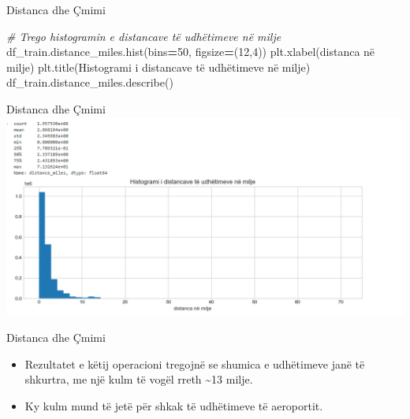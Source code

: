 \documentclass[
  ignorenonframetext,
]{beamer}
\newenvironment{Shaded}{\begin{snugshade}}{\end{snugshade}}
\newcommand{\CommentTok}[1]{\textcolor[rgb]{0.56,0.35,0.01}{\textit{#1}}}
\newcommand{\DecValTok}[1]{\textcolor[rgb]{0.00,0.00,0.81}{#1}}
\newcommand{\NormalTok}[1]{#1}
\newcommand{\OperatorTok}[1]{\textcolor[rgb]{0.81,0.36,0.00}{\textbf{#1}}}
\newcommand{\StringTok}[1]{\textcolor[rgb]{0.31,0.60,0.02}{#1}}
\begin{document}
\begin{frame}[fragile]{Distanca dhe Çmimi}
\protect\hypertarget{distanca-dhe-uxe7mimi-2}{}

\begin{Shaded}
\begin{Highlighting}[]
\CommentTok{\# Trego histogramin e distancave të udhëtimeve në milje}
\NormalTok{df\_train.distance\_miles.hist(bins}\OperatorTok{=}\DecValTok{50}\NormalTok{, figsize}\OperatorTok{=}\NormalTok{(}\DecValTok{12}\NormalTok{,}\DecValTok{4}\NormalTok{))}
\NormalTok{plt.xlabel(}\StringTok{\textquotesingle{}distanca në milje\textquotesingle{}}\NormalTok{)}
\NormalTok{plt.title(}\StringTok{\textquotesingle{}Histogrami i distancave të udhëtimeve në milje\textquotesingle{}}\NormalTok{)}
\NormalTok{df\_train.distance\_miles.describe()}
\end{Highlighting}
\end{Shaded}
\end{frame}

\begin{frame}{Distanca dhe Çmimi}
\protect\hypertarget{distanca-dhe-uxe7mimi-3}{}
\includegraphics{./Figs/train21.png}
\end{frame}

\begin{frame}{Distanca dhe Çmimi}
\protect\hypertarget{distanca-dhe-uxe7mimi-4}{}
\begin{itemize}
\item
  Rezultatet e këtij operacioni tregojnë se shumica e udhëtimeve janë të
  shkurtra, me një kulm të vogël rreth \textasciitilde13 milje.
\item
  Ky kulm mund të jetë për shkak të udhëtimeve të aeroportit.
\end{itemize}
\end{frame}
\end{document}
